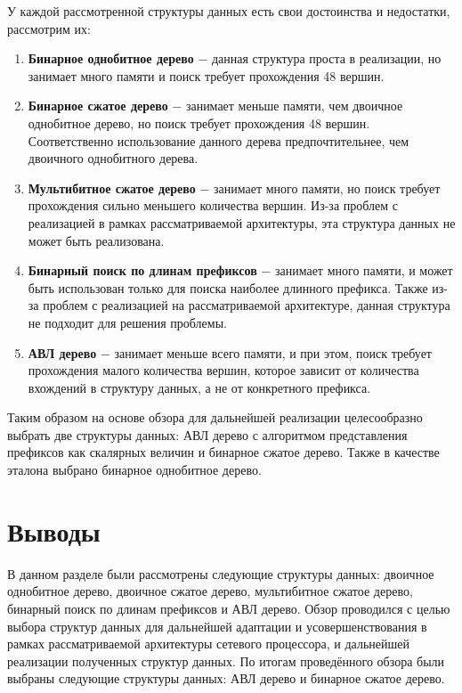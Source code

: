 \documentclass[a4paper, 12pt, titlepage, finall]{extreport}
\begin{document}
        У каждой рассмотренной структуры данных есть свои достоинства и недостатки, рассмотрим их:
        \begin{enumerate}
            \item \textbf{Бинарное однобитное дерево} $-$ данная структура проста в реализации, но занимает много памяти и поиск требует прохождения 48 вершин.
            \item \textbf{Бинарное сжатое дерево} $-$ занимает меньше памяти, чем двоичное однобитное дерево, но поиск требует прохождения 48 вершин. 
                Соответственно использование данного дерева предпочтительнее, чем двоичного однобитного дерева.
            \item \textbf{Мультибитное сжатое дерево} $-$ занимает много памяти, но поиск требует прохождения сильно меньшего количества вершин. 
                Из-за проблем с реализацией в рамках рассматриваемой архитектуры, эта структура данных не может быть реализована.
            \item \textbf{Бинарный поиск по длинам префиксов} $-$ занимает много памяти, и может быть использован только для поиска наиболее длинного префикса.
                Также из-за проблем с реализацией на рассматриваемой архитектуре, данная структура не подходит для решения проблемы.
            \item \textbf{АВЛ дерево} $-$ занимает меньше всего памяти, и при этом, поиск требует прохождения малого количества вершин,
                которое зависит от количества вхождений в структуру данных, а не от конкретного префикса.
        \end{enumerate}

        Таким образом на основе обзора для дальнейшей реализации целесообразно выбрать две структуры данных: 
        АВЛ дерево с алгоритмом представления префиксов как скалярных величин и бинарное сжатое дерево. 
        Также в качестве эталона выбрано бинарное однобитное дерево.
    \section{Выводы}
        В данном разделе были рассмотрены следующие структуры данных: двоичное однобитное дерево, двоичное сжатое дерево, мультибитное сжатое дерево, бинарный поиск по длинам префиксов и АВЛ дерево.
        Обзор проводился с целью выбора структур данных для дальнейшей адаптации и усовершенствования в рамках рассматриваемой архитектуры сетевого процессора, 
        и дальнейшей реализации полученных структур данных. По итогам проведённого обзора были выбраны следующие структуры данных: АВЛ дерево и бинарное сжатое дерево.
\end{document}
